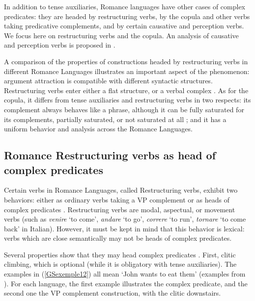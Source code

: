 \documentclass[output=paper
	        ,collection
	        ,collectionchapter
 	        ,biblatex
                ,babelshorthands
                ,newtxmath
                ,draftmode
                ,colorlinks, citecolor=brown
]{langscibook}
\begin{document}
{In addition to tense auxiliaries, Romance languages have other cases of complex predicates: they are headed by restructuring verbs, by the copula and other verbs taking predicative complements, and by certain causative and perception verbs. We focus here on restructuring
verbs and the copula. An analysis of causative and perception verbs is proposed in \citep{abeille1995doublestructure, AGMS98a, AG2010}. 

A comparison of the properties of constructions headed by restructuring verbs in different Romance Languages illustrates an important aspect of the phenome\-non: argument attraction is compatible with different syntactic structures. Restructuring verbs enter either a flat structure, or a verbal complex \citep{Monachesi98a, abeille2001deux, AG2010}. As for the copula, it differs from tense auxiliaries and restructuring verbs in two respects: its complement always behaves like a phrase, although it can be fully saturated for its complements, partially saturated, or not saturated at all \citep{abeille2001varieties, AG2002b-u}; and it has a uniform behavior and analysis across the Romance Languages.

\subsection{Romance Restructuring verbs as head of complex predicates} \label{GSsection3.1}

Certain verbs in Romance Languages, called Restructuring verbs, exhibit two behaviors: either as ordinary verbs taking a VP complement or as heads of complex predicates \citep{rizzi1982issues, aissen1983clause}. Restructuring verbs are modal, aspectual, or movement verbs (such as \emph{venire} `to come’, \emph{andare} `to go’, \emph{correre} `to run’, \emph{tornare} `to come back’ in Italian). However, it must be kept in mind that this behavior is lexical: verbs which are close semantically may not be heads of complex predicates. 

Several properties show that they may head complex predicates \citep[323-328]{Monachesi98a}. First, clitic climbing, which is optional (while it is obligatory with tense auxiliaries). The examples in (\ref{GSexemple12}) all mean `John wants to eat them’ (examples from \citealt[113]{AG2010}). For each language, the first example illustrates the complex predicate, and the second one the VP complement construction, with the clitic downstairs.

\eal 
	\label{GSexemple12} 
	 \label{GSexemple 12a}  
		
}
\end{document}
